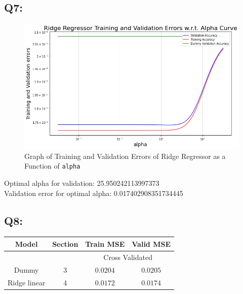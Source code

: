 \documentclass{article}
\newcommand{\code}[1]{\texttt{#1}}
\begin{document}
\subsection*{Q7:}
    \begin{figure}[H]
        \centering
        \includegraphics[scale=0.5]{q7.png}
        \caption{Graph of Training and Validation Errors of Ridge Regressor as a Function of \code{alpha}}
        \label{fig:q7}
    \end{figure}
    Optimal alpha for validation: 25.950242113997373\\
    Validation error for optimal alpha: 0.017402908351734445

\subsection*{Q8:}
    \begin{center}
        \begin{tabular}{|c|c|c|c|}
            \hline
            \rowcolor{gray!60}
            Model & Section & Train MSE & Valid MSE\\ \hline
            \rowcolor{gray!20}
            ~&~ & \multicolumn{2}{c|}{Cross Validated}\\ \hline
            Dummy & 3 & $0.0204$ & $0.0205$\\ \hline
            Ridge linear & 4 & $0.0172$ & $0.0174$\\ \hline
        \end{tabular}
    \end{center}
\end{document}
